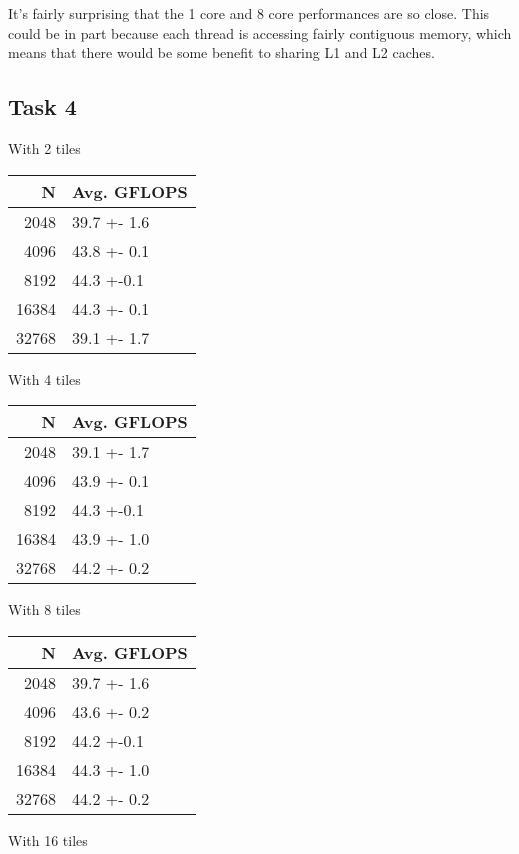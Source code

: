 \documentclass[11pt]{article}
\begin{document}
It's fairly surprising that the 1 core and 8 core performances are so close. This could be in part because each thread is accessing fairly contiguous memory, which means that there would be some benefit to sharing L1 and L2 caches.

\subsection{Task 4}
\label{sec:orgd568e38}

With 2 tiles

\begin{center}
\begin{tabular}{rl}
N & Avg. GFLOPS\\
\hline
2048 & 39.7 +- 1.6\\
4096 & 43.8 +- 0.1\\
8192 & 44.3 +-0.1\\
16384 & 44.3 +- 0.1\\
32768 & 39.1 +- 1.7\\
\end{tabular}
\end{center}


With 4 tiles

\begin{center}
\begin{tabular}{rl}
N & Avg. GFLOPS\\
\hline
2048 & 39.1 +- 1.7\\
4096 & 43.9 +- 0.1\\
8192 & 44.3 +-0.1\\
16384 & 43.9 +- 1.0\\
32768 & 44.2 +- 0.2\\
\end{tabular}
\end{center}

With 8 tiles

\begin{center}
\begin{tabular}{rl}
N & Avg. GFLOPS\\
\hline
2048 & 39.7 +- 1.6\\
4096 & 43.6 +- 0.2\\
8192 & 44.2 +-0.1\\
16384 & 44.3 +- 1.0\\
32768 & 44.2 +- 0.2\\
\end{tabular}
\end{center}


With 16 tiles
\end{document}
